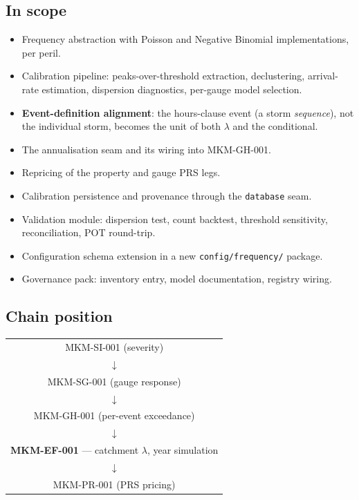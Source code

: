 \documentclass[11pt]{article}
\begin{document}
\subsection{In scope}

\begin{itemize}[nosep]
  \item Frequency abstraction with Poisson and Negative Binomial
        implementations, per peril.
  \item Calibration pipeline: peaks-over-threshold extraction, declustering,
        arrival-rate estimation, dispersion diagnostics, per-gauge model
        selection.
  \item \textbf{Event-definition alignment}: the hours-clause event (a storm
        \emph{sequence}), not the individual storm, becomes the unit of both
        $\lambda$ and the conditional.
  \item The annualisation seam and its wiring into MKM-GH-001.
  \item Repricing of the property and gauge PRS legs.
  \item Calibration persistence and provenance through the \texttt{database} seam.
  \item Validation module: dispersion test, count backtest, threshold
        sensitivity, reconciliation, POT round-trip.
  \item Configuration schema extension in a new \texttt{config/frequency/} package.
  \item Governance pack: inventory entry, model documentation, registry wiring.
\end{itemize}

\subsection{Chain position}

\begin{center}
\begin{tabular}{c}
MKM-SI-001 (severity) \\[0.2em]
$\downarrow$ \\[0.2em]
MKM-SG-001 (gauge response) \\[0.2em]
$\downarrow$ \\[0.2em]
MKM-GH-001 (per-event exceedance) \\[0.2em]
$\downarrow$ \\[0.2em]
\textbf{MKM-EF-001} --- catchment $\lambda$, year simulation \\[0.2em]
$\downarrow$ \\[0.2em]
MKM-PR-001 (PRS pricing) \\
\end{tabular}
\end{center}
\end{document}
